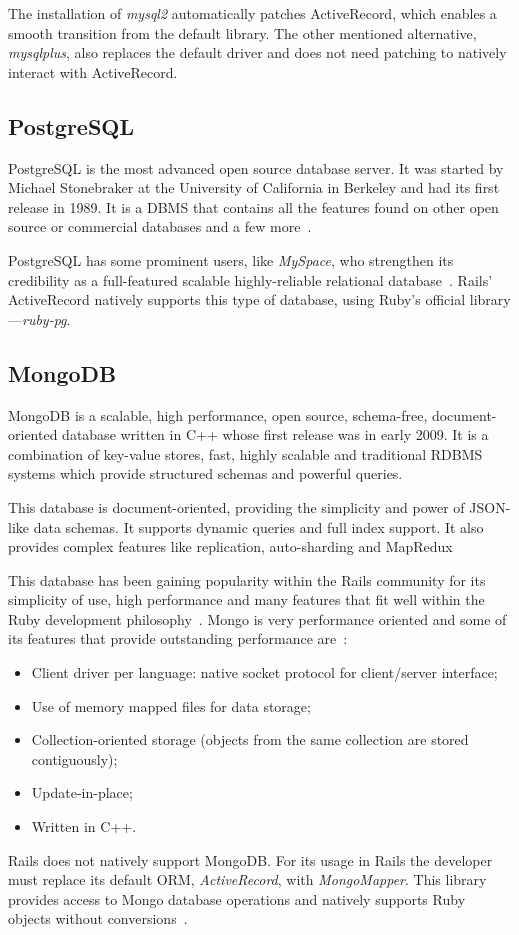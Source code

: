 The installation of \textit{mysql2} automatically patches ActiveRecord, which enables a smooth transition from the default library. The other mentioned alternative, \textit{mysqlplus}, also replaces the default driver and does not need patching to natively interact with ActiveRecord.


\subsection{PostgreSQL}
PostgreSQL is the most advanced open source database server. It was started by Michael Stonebraker at the University of California in Berkeley and had its first release in 1989. It is a DBMS that contains all the features found on other open source or commercial databases and a few more~\cite{beginning_postgresql}.

PostgreSQL has some prominent users, like \textit{MySpace}, who strengthen its credibility as a full-featured scalable highly-reliable relational database~\cite{petabyte_warehouses}. Rails' ActiveRecord natively supports this type of database, using Ruby's official library---\textit{ruby-pg}.


\subsection{MongoDB}
MongoDB is a scalable, high performance, open source, schema-free, document-oriented database written in C++ whose first release was in early 2009. It is a combination of key-value stores, fast, highly scalable and traditional RDBMS systems which provide structured schemas and powerful queries.

This database is document-oriented, providing the simplicity and power of JSON-like data schemas. It supports dynamic queries and full index support. It also provides complex features like replication, auto-sharding and MapRedux~\cite{mongodb}

This database has been gaining popularity within the Rails community for its simplicity of use, high performance and many features that fit well within the Ruby development philosophy~\cite{mongodb_rails}. Mongo is very performance oriented and some of its features that provide outstanding performance are~\cite{mongodb_couchdb}:
\begin{itemize}
  \item Client driver per language: native socket protocol for client/server interface;
  \item Use of memory mapped files for data storage;
  \item Collection-oriented storage (objects from the same collection are stored contiguously);
  \item Update-in-place;
  \item Written in C++.
\end{itemize}
Rails does not natively support MongoDB. For its usage in Rails the developer must replace its default ORM, \textit{ActiveRecord}, with \textit{MongoMapper}. This library provides access to Mongo database operations and natively supports Ruby objects without conversions~\cite{mongomapper}.


